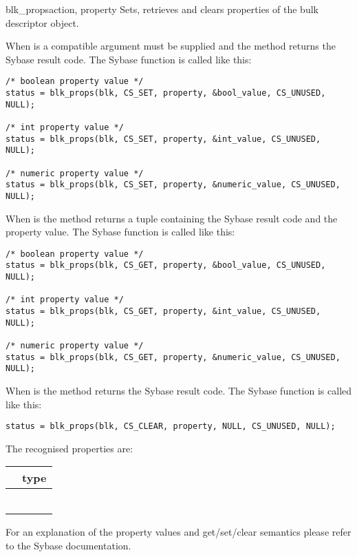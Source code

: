 \begin{methoddesc}[CS_BLKDESC]{blk_props}{action, property }
Sets, retrieves and clears properties of the bulk descriptor object.

When  is  a compatible  argument
must be supplied and the method returns the Sybase result code.  The
Sybase  function is called like this:

\begin{verbatim}
/* boolean property value */
status = blk_props(blk, CS_SET, property, &bool_value, CS_UNUSED, NULL);

/* int property value */
status = blk_props(blk, CS_SET, property, &int_value, CS_UNUSED, NULL);

/* numeric property value */
status = blk_props(blk, CS_SET, property, &numeric_value, CS_UNUSED, NULL);
\end{verbatim}

When  is  the method returns a tuple
containing the Sybase result code and the property value.  The Sybase
 function is called like this:

\begin{verbatim}
/* boolean property value */
status = blk_props(blk, CS_GET, property, &bool_value, CS_UNUSED, NULL);

/* int property value */
status = blk_props(blk, CS_GET, property, &int_value, CS_UNUSED, NULL);

/* numeric property value */
status = blk_props(blk, CS_GET, property, &numeric_value, CS_UNUSED, NULL);
\end{verbatim}

When  is  the method returns the Sybase
result code.  The Sybase  function is called
like this:

\begin{verbatim}
status = blk_props(blk, CS_CLEAR, property, NULL, CS_UNUSED, NULL);
\end{verbatim}

The recognised properties are:

\begin{longtable}{l|l}
\var{property} & type \\
\hline
\code{BLK_IDENTITY}        & \code{bool} \\
\code{BLK_NOAPI_CHK}       & \code{bool} \\
\code{BLK_SENSITIVITY_LBL} & \code{bool} \\
\code{ARRAY_INSERT}        & \code{bool} \\
\code{BLK_SLICENUM}        & \code{int} \\
\code{BLK_IDSTARTNUM}      & \code{numeric} \\
\end{longtable}

For an explanation of the property values and get/set/clear semantics
please refer to the Sybase documentation.
\end{methoddesc}

